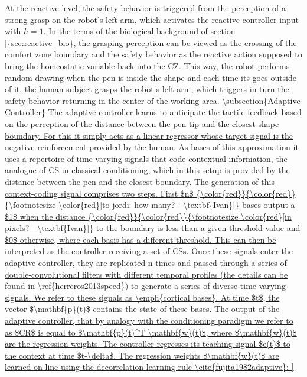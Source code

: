 \documentclass[letterpaper, 10 pt, conference]{ieeeconf}  %
\newcommand\ih[1]{{\color{red}}{\color{red}}{\footnotesize \color{red}[#1 - \textbf{Ivan}]}} %
\begin{document}
At the reactive level, the safety behavior is triggered from the perception of a strong grasp on the robot's left arm, which activates the reactive controller input with $h=1$. In the terms of the biological background of section \ref{{sec:reactive_bio}, the grasping perception can be viewed as the crossing of the comfort zone boundary and the safety behavior as the reactive action supposed to bring the homeostatic variable back into the CZ.  This way, the robot performs random drawing when the pen is inside the shape and each time its goes outside of it, the human subject grasps the robot's left arm, which triggers in turn the safety behavior returning in the center of the working area.

\subsection{Adaptive Controller}

The adaptive controller learns to anticipate the tactile feedback based on the perception of the distance between the pen tip and the closest shape boundary. For this it simply acts as a linear regressor whose target signal is the negative reinforcement provided by the human. As bases of this approximation it uses a repertoire of time-varying signals that code contextual information, the analogue of CS in classical conditioning, which in this setup is provided by the distance between the pen and the closest boundary. 

The generation of this context-coding signal comprises two steps. First $n$ \ih{to jordi: how many?} bases output a $1$ when the distance \ih{in pixels?} to the boundary is less than a given threshold value and $0$ otherwise, where each basis has a different threshold. This can then be interpreted as the controller receiving a set of CSs. Once these signals enter the adaptive controller, they are replicated n-times and passed through a series of double-convolutional filters with different temporal profiles (the details can be found in \ref{herreros2013speed}) to generate a series of diverse time-varying signals. We refer to these signals as \emph{cortical bases}. At time $t$, the vector $\mathbf{p}(t)$ contains the state of these bases. The output of the adaptive controller, that by analogy with the conditioning paradigm we refer to as $CR$ is equal to $\mathbf{p}(t)^T \mathbf{w}(t)$, where $\mathbf{w}(t)$ are the regression weights.

The controller regresses its teaching signal $e(t)$ to the context at time $t-\delta$. The regression weights $\mathbf{w}(t)$ are learned on-line using the decorrelation learning rule \cite{fujita1982adaptive}:

}
\end{document}
